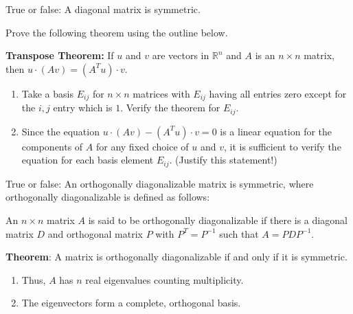 \begin{enumerate}

\Problem True or false: A diagonal matrix is symmetric.
\vspace{1in}



\Problem
Prove the following theorem using the outline below.

\textbf{Transpose Theorem:}
If $u$ and $v$ are vectors in $\mathbb{R}^n$ and $A$ is an $n \times n$ matrix, then $u \cdot (Av) = (A^Tu) \cdot v.$

\begin{enumerate}
    \item[a)] Take a basis $E_{ij}$ for $n \times n$ matrices with $E_{ij}$ having all entries zero except for the $i,j$ entry which is $1.$ Verify the theorem for $E_{ij}.$\vfill
    \item[b)] Since the equation $u \cdot (Av) - (A^Tu) \cdot v = 0$ is a linear equation for the components of $A$ for any fixed choice of $u$ and $v$, it is sufficient to verify the equation for each basis element $E_{ij}.$ (Justify this statement!)\vfill
\end{enumerate}

\newpage


\Problem True or false: An orthogonally diagonalizable matrix is symmetric, where orthogonally diagonalizable is defined as follows:

\begin{defn}
An $n \times n$ matrix $A$ is said to be orthogonally diagonalizable if there is a diagonal matrix $D$ and orthogonal matrix $P$ with $P^T = P^{-1}$ such that $A = PDP^{-1}.$
\end{defn}


\vfill


\textbf{Theorem}:
A matrix is orthogonally diagonalizable if and only if it is symmetric.
\begin{enumerate}
    \item[a)] Thus, $A$ has $n$ real eigenvalues counting multiplicity.
    \item[b)] The eigenvectors form a complete, orthogonal basis.
\end{enumerate}
\vfill



\end{enumerate}
